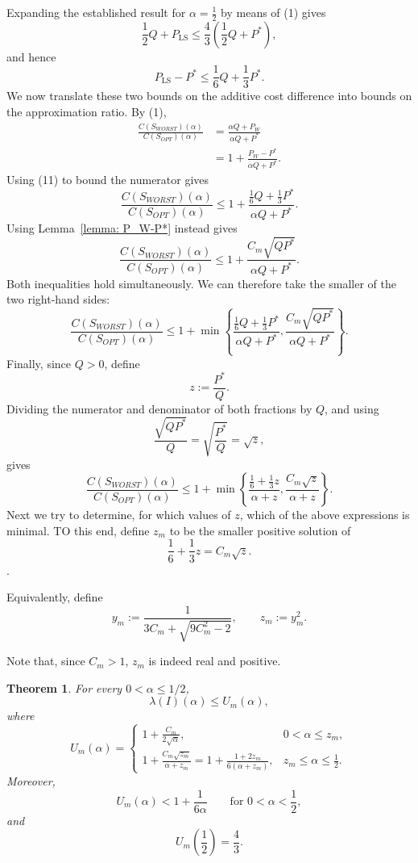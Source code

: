 \documentclass[11pt]{article}
\newtheorem{theorem}{Theorem}
\begin{document}
Expanding the established result for $\alpha = \frac12$ by means of (1) gives
\[
 \frac12Q+P_{\mathrm{LS}}
 \le
 \frac43\left(\frac12Q+P^*\right),
\]
and hence
\[
 P_{\mathrm{LS}}-P^*\le\frac16Q+\frac13P^*.
\tag{11}
\]
We now translate these two bounds on the additive cost difference into
bounds on the approximation ratio. By (1),
\[
\begin{aligned}
\frac{C(S_{WORST})(\alpha)}{C(S_{OPT})(\alpha)}
&=
\frac{\alpha Q+P_W}{\alpha Q+P^*}\\
&=
1+\frac{P_W-P^*}{\alpha Q+P^*}.
\end{aligned}
\]
Using (11) to bound the numerator gives
\[
\frac{C(S_{WORST})(\alpha)}{C(S_{OPT})(\alpha)}
\le
1+
\frac{\frac16Q+\frac13P^*}{\alpha Q+P^*}.
\]
Using Lemma~\ref{lemma: P_W-P*} instead gives
\[
\frac{C(S_{WORST})(\alpha)}{C(S_{OPT})(\alpha)}
\le
1+
\frac{C_m\sqrt{QP^*}}{\alpha Q+P^*}.
\]
Both inequalities hold simultaneously. We can therefore take the smaller
of the two right-hand sides:
\[
\frac{C(S_{WORST})(\alpha)}{C(S_{OPT})(\alpha)}
\le
1+
\min\left\{
\frac{\frac16Q+\frac13P^*}{\alpha Q+P^*},
\frac{C_m\sqrt{QP^*}}{\alpha Q+P^*}
\right\}.
\]
Finally, since \(Q>0\), define
\[
 z:=\frac{P^*}{Q}.
\]
Dividing the numerator and denominator of both fractions by \(Q\), and
using
\[
\frac{\sqrt{QP^*}}{Q}
=
\sqrt{\frac{P^*}{Q}}
=\sqrt z,
\]
gives
\[
 \frac{C(S_{WORST})(\alpha)}{C(S_{OPT})(\alpha)}
 \le
 1+
 \min\left\{
 \frac{\frac16+\frac13z}{\alpha+z},
 \frac{C_m\sqrt z}{\alpha+z}
 \right\}.
\tag{12}
\]
Next we try to determine, for which values of $z$, which of the above expressions is minimal. 
TO this end, define \(z_m\)  to be the smaller positive solution of
\[
 \frac16+\frac13z=C_m\sqrt z.
\tag{13}
\]. 

Equivalently, define
\[
 y_m:=
 \frac{1}{3C_m+\sqrt{9C_m^2-2}},
 \qquad
 z_m:=y_m^2.
\tag{14}
\]

Note that, since $C_m > 1$, $z_m$ is indeed real and positive. 

\begin{theorem}
\label{thm:main}
For every \(0<\alpha\le1/2\),
\[
 \lambda(I)(\alpha)
 \le U_m(\alpha),
\tag{15}
\]
where
\[
 U_m(\alpha)=
 \begin{cases}
 \displaystyle
 1+\frac{C_m}{2\sqrt\alpha},
 &0<\alpha\le z_m,\\[3mm]
 \displaystyle
 1+\frac{C_m\sqrt{z_m}}{\alpha+z_m}
 =
 1+\frac{1+2z_m}{6(\alpha+z_m)},
 &z_m\le\alpha\le\frac12.
 \end{cases}
\tag{16}
\]
Moreover,
\[
 U_m(\alpha)<1+\frac{1}{6\alpha}
 \qquad\text{for }0<\alpha<\frac12,
\tag{17}
\]
and
\[
 U_m\left(\frac12\right)=\frac43.
\tag{18}
\]
\end{theorem}
\end{document}
